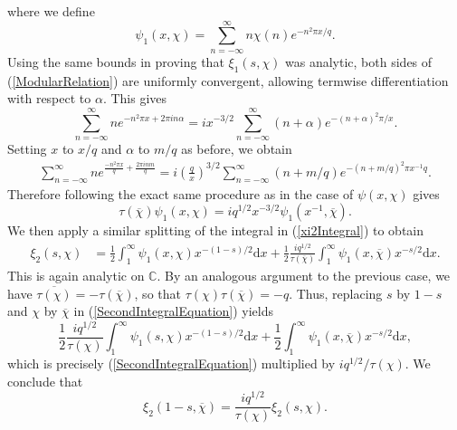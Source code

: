 where we define 
\begin{equation}
    \psi_1(x, \chi) = \sum_{n=-\infty}^{\infty} n \chi(n) e^{-n^{2} \pi x / q}. \nonumber
\end{equation}
Using the same bounds in proving that $\xi_1(s, \chi)$ was analytic, both sides of (\ref{ModularRelation}) are uniformly convergent, allowing termwise differentiation with respect to $\alpha$. This gives
\begin{equation}
    \sum_{n=-\infty}^{\infty} n e^{-n^{2}\pi x + 2\pi i n \alpha} = i x^{-3/2} \sum_{n=-\infty}^{\infty}(n + \alpha) e^{-(n + \alpha)^{2}\pi/x}. \nonumber
\end{equation}
Setting $x$ to $x/q$ and $\alpha$ to $m/q$ as before, we obtain
\begin{align}
    \sum_{n=-\infty}^{\infty} n e^{\frac{-n^{2}\pi x}{q} + \frac{2\pi i n m}{q}} = i\left( \frac{q}{x} \right)^{3/2} \sum_{n=-\infty}^{\infty} (n + m/q) e^{-(n + m/q)^{2}\pi x^{-1} q}. \nonumber
\end{align}
Therefore following the exact same procedure as in the case of $\psi(x, \chi)$ gives
\begin{equation}
    \tau(\overline{\chi}) \psi_1(x, \chi) = i q^{1/2} x^{-3/2} \psi_{1}(x^{-1}, \overline{\chi}). \nonumber
\end{equation}
We then apply a similar splitting of the integral in (\ref{xi2Integral}) to obtain
\begin{align}
\label{SecondIntegralEquation}
    \xi_2(s, \chi) &= \frac12 \int_{1}^{\infty}\psi_1(x, \chi) x^{-(1 - s)/2} \mathrm{d} x + \frac12 \frac{i q^{1/2}}{\tau(\overline{\chi})}\int_{1}^{\infty} \psi_1(x, \overline{\chi})x^{-s/2} \mathrm{d} x.  
\end{align}
This is again analytic on $\mathbb{C}$. By an analogous argument to the previous case, we have $\overline{\tau(\chi)} = -\tau(\overline{\chi})$, so that $\tau(\chi)\tau(\overline{\chi}) = -q$. Thus, replacing $s$ by $1-s$ and $\chi$ by $\overline{\chi}$ in (\ref{SecondIntegralEquation}) yields
\begin{equation}
    \frac12 \frac{i q^{1/2}}{\tau(\chi)}\int_{1}^{\infty}\psi_1(s, \chi) x^{-(1 - s)/2} \mathrm{d} x + \frac12 \int_{1}^{\infty} \psi_1(x, \overline{\chi})x^{-s/2} \mathrm{d} x, \nonumber
\end{equation}
which is precisely (\ref{SecondIntegralEquation}) multiplied by $i q^{1/2}/\tau(\chi)$. We conclude that
\begin{equation}
    \xi_{2}(1-s, \overline{\chi}) = \frac{i q^{1/2}}{\tau(\chi)} \xi_{2}(s, \chi). \nonumber
\end{equation}

